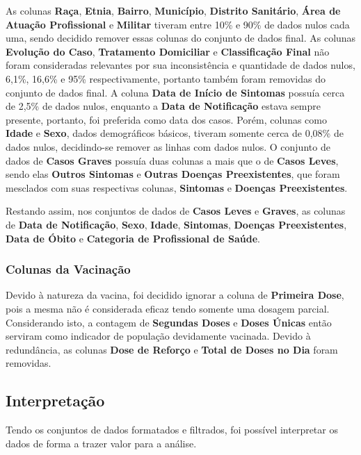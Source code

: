 As colunas \textbf{Raça}, \textbf{Etnia}, \textbf{Bairro}, \textbf{Município}, \textbf{Distrito Sanitário}, \textbf{Área de Atuação Profissional} e \textbf{Militar} tiveram entre 10\% e 90\% de dados nulos cada uma, sendo decidido remover essas colunas do conjunto de dados final.
As colunas \textbf{Evolução do Caso}, \textbf{Tratamento Domiciliar} e \textbf{Classificação Final} não foram consideradas relevantes por sua inconsistência e quantidade de dados nulos, 6,1\%, 16,6\% e 95\% respectivamente, portanto também foram removidas do conjunto de dados final.
A coluna \textbf{Data de Início de Sintomas} possuía cerca de 2,5\% de dados nulos, enquanto a \textbf{Data de Notificação} estava sempre presente, portanto, foi preferida como data dos casos.
Porém, colunas como \textbf{Idade} e \textbf{Sexo}, dados demográficos básicos, tiveram somente cerca de 0,08\% de dados nulos, decidindo-se remover as linhas com dados nulos.
O conjunto de dados de \textbf{Casos Graves} possuía duas colunas a mais que o de \textbf{Casos Leves}, sendo elas \textbf{Outros Sintomas} e \textbf{Outras Doenças Preexistentes}, que foram mesclados com suas respectivas colunas, \textbf{Sintomas} e \textbf{Doenças Preexistentes}.


Restando assim, nos conjuntos de dados de \textbf{Casos Leves} e \textbf{Graves}, as colunas de \textbf{Data de Notificação}, \textbf{Sexo}, \textbf{Idade}, \textbf{Sintomas}, \textbf{Doenças Preexistentes}, \textbf{Data de Óbito} e \textbf{Categoria de Profissional de Saúde}.

\subsubsection{Colunas da Vacinação}
\label{subsubsec:vacinacao-filtragem}

Devido à natureza da vacina, foi decidido ignorar a coluna de \textbf{Primeira Dose}, pois a mesma não é considerada eficaz tendo somente uma dosagem parcial.
Considerando isto, a contagem de \textbf{Segundas Doses} e \textbf{Doses Únicas} então serviram como indicador de população devidamente vacinada. 
Devido à redundância, as colunas \textbf{Dose de Reforço} e \textbf{Total de Doses no Dia} foram removidas.


\subsection{Interpretação}
\label{subsec:interpretando}

Tendo os conjuntos de dados formatados e filtrados, foi possível interpretar os dados de forma a trazer valor para a análise.

